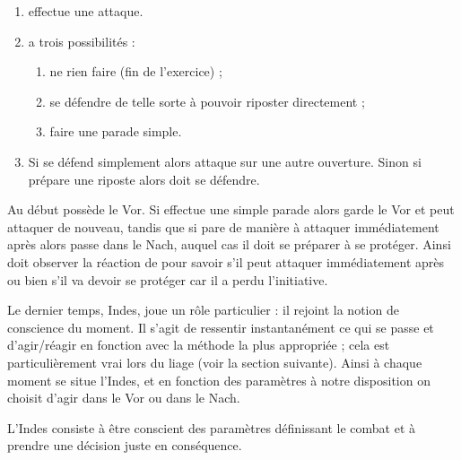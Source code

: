 \begin{exercice}
	
	
	\begin{enumerate}
		\item \A effectue une attaque.
		
		\item \D a trois possibilités :
		\begin{enumerate}
			\item ne rien faire (fin de l'exercice) ;
			\item se défendre de telle sorte à pouvoir riposter directement ;
			\item faire une parade simple.
		\end{enumerate}
		
		\item Si \D se défend simplement alors \A attaque sur une autre ouverture.
		Sinon si \D prépare une riposte alors \A doit se défendre.
	\end{enumerate}
	
	Au début \A possède le Vor.
	Si \D effectue une simple parade alors \A garde le Vor et peut attaquer de nouveau, tandis que si \D pare de manière à attaquer immédiatement après alors \A passe dans le Nach, auquel cas il doit se préparer à se protéger.
	Ainsi \A doit observer la réaction de \D pour savoir s'il peut attaquer immédiatement après ou bien s'il va devoir se protéger car il a perdu l'initiative.
\end{exercice}



Le dernier temps, Indes, joue un rôle particulier : il rejoint la notion de conscience du moment.
Il s'agit de ressentir instantanément ce qui se passe et d'agir/réagir en fonction avec la méthode la plus appropriée ; cela est particulièrement vrai lors du liage (voir la section suivante).
Ainsi à chaque moment se situe l'Indes, et en fonction des paramètres à notre disposition on choisit d'agir dans le Vor ou dans le Nach.

\begin{definition}

	L'Indes consiste à être conscient des paramètres définissant le combat et à prendre une décision juste en conséquence.
\end{definition}


